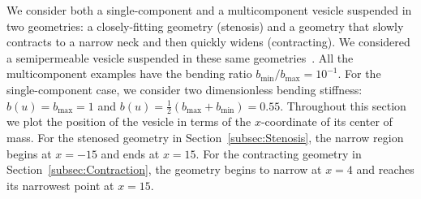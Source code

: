 \documentclass[twoside,twocolumn,9pt]{article}
\newcommand{\nn}{\mathbf{n}}
\renewcommand{\ss}{\mathbf{s}}
\newcommand{\uu}{\mathbf{u}}
\newcommand{\xx}{\mathbf{x}}
\begin{document}


We consider both a single-component and a multicomponent vesicle
suspended in two geometries: a closely-fitting geometry (stenosis) and a
geometry that slowly contracts to a narrow neck and then quickly widens
(contracting). We considered a semipermeable vesicle suspended in these
same geometries~\cite{qua-gan-you2021}. All the multicomponent examples
have the bending ratio $b_{\min}/b_{\max} = 10^{-1}$. For the
single-component case, we consider two dimensionless bending stiffness:
$b(u) = b_{\max} = 1$ and $b(u) = \frac{1}{2}(b_{\max} + b_{\min}) =
0.55$. Throughout this section we plot the position of the vesicle in
terms of the $x$-coordinate of its center of mass. For the stenosed
geometry in Section~\ref{subsec:Stenosis}, the narrow region begins at
$x=-15$ and ends at $x=15$. For the contracting geometry in
Section~\ref{subsec:Contraction}, the geometry begins to narrow at $x=4$
and reaches its narrowest point at $x=15$.
\end{document}
